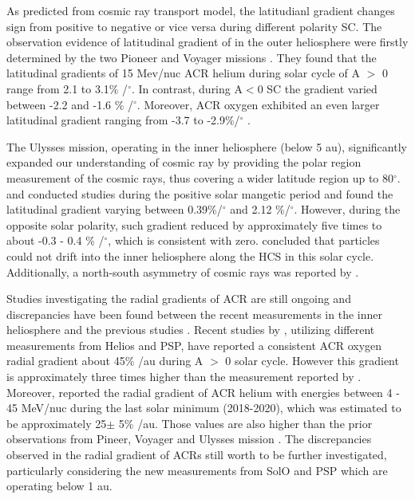 As predicted from cosmic ray transport model, the latitudianl gradient changes sign from positive to negative or vice versa during different polarity \ac{SC}. The observation evidence of latitudinal gradient of in the outer heliosphere were firstly determined by the two Pioneer and Voyager missions \citep{Mckibben1979ApJ, Cummings1987GeoRL, Christon1986JGR}. They found that the latitudinal gradients of 15 Mev/nuc \ac{ACR} helium during solar cycle of A $>$ 0 range from 2.1 to 3.1\% /$^\circ$. In contrast, during A$<$0 \acl{SC} the gradient varied between -2.2 and -1.6 \% /$^\circ$. Moreover, ACR oxygen exhibited an even larger latitudinal gradient ranging from -3.7 to -2.9\%/$^\circ$ \citep{Cummings1987GeoRL}.

The Ulysses mission, operating in the inner heliosphere (below 5 au), significantly expanded our understanding of cosmic ray by providing the polar region measurement of the cosmic rays, thus covering a wider latitude region up to 80$^\circ$. \citet{Lanzerotti1995GeoRL} and \citet{Heber1998JGR} conducted studies during the positive solar mangetic period and found the latitudinal gradient varying between 0.39\%/$^\circ$ and 2.12 \%/$^\circ$. However, during the opposite solar polarity, such gradient reduced by approximately five times to about -0.3 - 0.4 \% /$^\circ$, which is consistent with zero. \citet{Cummings2009GeoRL} concluded that particles could not drift into the inner heliosphere along the \ac{HCS} in this solar cycle. Additionally, a north-south asymmetry of cosmic rays was reported by \citep{Simpson1996ApJ}.

Studies investigating the radial gradients of \ac{ACR} are still ongoing and discrepancies have been found between the recent measurements in the inner heliosphere and the previous studies \citep{Webber1981JGR, Marsden1999AdSpR}. Recent studies by \citet{Rankin2021ApJ, Rankin2022ApJ, Marquardt2018AA}, utilizing different measurements from Helios and \ac{PSP}, have reported a consistent ACR oxygen radial gradient about 45\% /au during A $>$ 0 solar cycle. However this gradient is approximately three times higher than the measurement reported by \citet{Webber1981JGR}. Moreover, \citet{Rankin2022ApJ} reported the radial gradient of ACR helium with energies between 4 - 45 MeV/nuc during the last solar minimum (2018-2020), which was estimated to be approximately 25$\pm$ 5\% /au. Those values are also higher than the prior observations from Pineer, Voyager and Ulysses mission \citep{McDonald2001ICRC, Webber1981JGR, McKibben1989JGR, McDonald1986GeoRL, Cummings1987GeoRL, Cummings1995GeoRL}. The discrepancies observed in the radial gradient of \acp{ACR} still worth to be further investigated, particularly considering the new measurements from \ac{SolO} and \ac{PSP} which are operating below 1 au.


